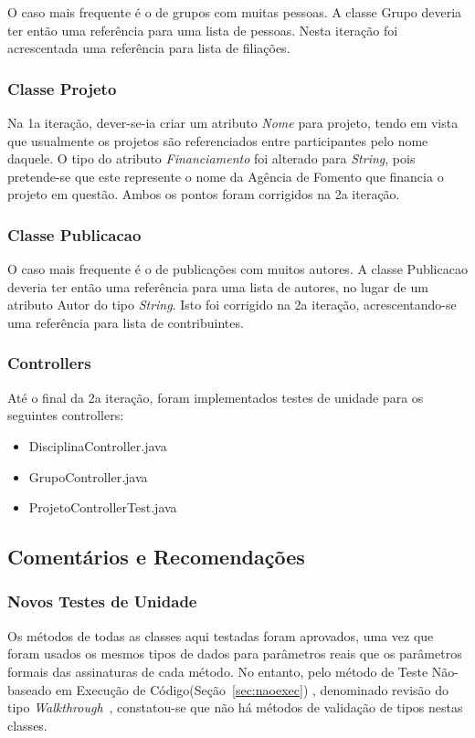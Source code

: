 \documentclass[11pt, a4paper]{book}
\begin{document}
O caso mais frequente é o de grupos com muitas pessoas. A classe Grupo deveria ter então uma referência para uma lista de pessoas. Nesta iteração foi acrescentada uma referência para lista de filiações.

\subsubsection{Classe Projeto}

Na 1a iteração, dever-se-ia criar um atributo \emph{Nome} para projeto, tendo em vista que usualmente os projetos são referenciados entre participantes pelo nome daquele. O tipo do atributo \emph{Financiamento} foi alterado para \emph{String}, pois pretende-se que este represente o nome da Agência de Fomento que financia o projeto em questão. Ambos os pontos foram corrigidos na 2a iteração.

\subsubsection{Classe Publicacao}

O caso mais frequente é o de publicações com muitos autores. A classe Publicacao deveria ter então uma referência para uma lista de autores, no lugar de um atributo Autor do tipo \emph{String}. Isto foi corrigido na 2a iteração, acrescentando-se uma referência para lista de contribuintes.


\subsubsection{Controllers}

Até o final da 2a iteração, foram implementados testes de unidade para os seguintes controllers:

\begin{itemize}
\item DisciplinaController.java
\item GrupoController.java
\item ProjetoControllerTest.java
\end{itemize}

\subsection{Comentários e Recomendações}

\subsubsection{Novos Testes de Unidade}
Os métodos de todas as classes aqui testadas foram aprovados, uma vez que foram usados os mesmos tipos de dados para parâmetros reais que os parâmetros formais das assinaturas de cada método. No entanto, pelo método de Teste Não-baseado em Execução de Código(Seção~\ref{sec:naoexec}) , denominado revisão do tipo \emph{Walkthrough}~\citep{schach2007}, constatou-se que não há métodos de validação de tipos nestas classes. 
\end{document}
